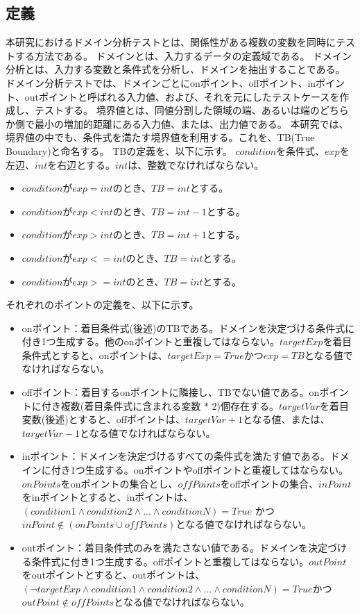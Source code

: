 \documentclass[uplatex, report, a4j, 10pt]{jsbook}
\begin{document}
\subsection{定義}\label{sec:define}
本研究におけるドメイン分析テストとは、関係性がある複数の変数を同時にテストする方法である\cite{izon}\cite{istqb}。
ドメインとは、入力するデータの定義域である。
ドメイン分析とは、入力する変数と条件式を分析し、ドメインを抽出することである。
ドメイン分析テストでは、ドメインごとにonポイント、offポイント、inポイント、outポイントと呼ばれる入力値、および、それを元にしたテストケースを作成し、テストする。
境界値とは、同値分割した領域の端、あるいは端のどちらか側で最小の増加的距離にある入力値、または、出力値である\cite{istqb}。
本研究では、境界値の中でも、条件式を満たす境界値を利用する。これを、TB(True Boundary)と命名する。
TBの定義を、以下に示す。
$condition$を条件式、$exp$を左辺、$int$を右辺とする。$int$は、整数でなければならない。
\begin{itemize}
  \item $condition$が$exp = int$のとき、$TB = int$とする。
  \item $condition$が$exp < int$のとき、$TB = int - 1$とする。
  \item $condition$が$exp > int$のとき、$TB = int + 1$とする。
  \item $condition$が$exp <= int$のとき、$TB = int$とする。
  \item $condition$が$exp >= int$のとき、$TB = int$とする。
\end{itemize}
それぞれのポイントの定義を、以下に示す。
\begin{itemize}
  \item onポイント：着目条件式(後述)のTBである。ドメインを決定づける条件式に付き1つ生成する。他のonポイントと重複してはならない。$targetExp$を着目条件式とすると、onポイントは、$targetExp = True$かつ$exp = TB$となる値でなければならない。
  \item offポイント：着目するonポイントに隣接し、TBでない値である。onポイントに付き複数(着目条件式に含まれる変数 $*$ 2)個存在する。$targetVar$を着目変数(後述)とすると、offポイントは、$targetVar + 1$となる値、または、$targetVar - 1$となる値でなければならない。
  \item inポイント：ドメインを決定づけるすべての条件式を満たす値である。ドメインに付き1つ生成する。onポイントやoffポイントと重複してはならない。$onPoints$をonポイントの集合とし、$offPoints$をoffポイントの集合、$inPoint$をinポイントとすると、inポイントは、 $(condition1 \land condition2 \land ... \land conditionN) = True$ かつ $inPoint \notin (onPoints \cup offPoints)$となる値でなければならない。
  \item outポイント：着目条件式のみを満たさない値である。ドメインを決定づける条件式に付き1つ生成する。offポイントと重複してはならない。$outPoint$をoutポイントとすると、outポイントは、$ (\lnot targetExp \land condition1 \land condition2 \land ... \land conditionN) = True$かつ$outPoint \notin offPoints$となる値でなければならない。
\end{itemize}
\end{document}
